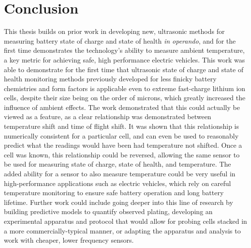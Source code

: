 \chapter{Conclusion}
This thesis builds on prior work in developing new, ultrasonic methods for measuring battery state of charge and state of health \emph{in operando}, and for the first time demonstrates the technology's ability to measure ambient temperature, a key metric for achieving safe, high performance electric vehicles. This work was able to demonstrate for the first time that ultrasonic state of charge and state of health monitoring methods previously developed for less finicky battery chemistries and form factors is applicable even to extreme fast-charge lithium ion cells, despite their size being on the order of microns, which greatly increased the influence of ambient effects. The work demonstrated that this could actually be viewed as a feature, as a clear relationship was demonstrated between temperature shift and time of flight shift. It was shown that this relationship is numerically consistent for a particular cell, and can even be used to reasonably predict what the readings would have been had temperature not shifted. 
Once a cell was known, this relationship could be reversed, allowing the same sensor to be used for measuring state of charge, state of health, and temperature. The added ability for a sensor to also measure temperature could be very useful in high-performance applications such as electric vehicles, which rely on careful temperature monitoring to ensure safe battery operation and long battery lifetime.
Further work could include going deeper into this line of research by building predictive models to quantify observed plating, developing an experimental apparatus and protocol that would allow for probing cells stacked in a more commercially-typical manner, or adapting the apparatus and analysis to work with cheaper, lower frequency sensors.